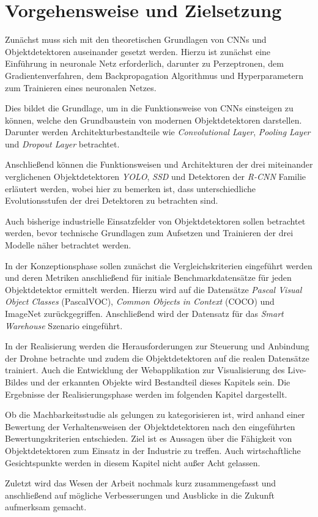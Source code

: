 \section{Vorgehensweise und Zielsetzung}

Zunächst muss sich mit den theoretischen Grundlagen von CNNs und Objektdetektoren auseinander gesetzt werden. Hierzu ist zunächst eine Einführung in neuronale Netz erforderlich, darunter zu Perzeptronen, dem Gradientenverfahren, dem Backpropagation Algorithmus und Hyperparametern zum Trainieren eines neuronalen Netzes. 

Dies bildet die Grundlage, um in die Funktionsweise von CNNs einsteigen zu können, welche den Grundbaustein von modernen Objektdetektoren darstellen. Darunter werden Architekturbestandteile wie \textit{Convolutional Layer}, \textit{Pooling Layer} und \textit{Dropout Layer} betrachtet. 

Anschließend können die Funktionsweisen und Architekturen der drei miteinander verglichenen Objektdetektoren \textit{YOLO}, \textit{SSD} und Detektoren der \textit{R-CNN} Familie erläutert werden, wobei hier zu bemerken ist, dass unterschiedliche Evolutionsstufen der drei Detektoren zu betrachten sind. 

Auch bisherige industrielle Einsatzfelder von Objektdetektoren sollen betrachtet werden, bevor technische Grundlagen zum Aufsetzen und Trainieren der drei Modelle näher betrachtet werden. 

In der Konzeptionsphase sollen zunächst die Vergleichskriterien eingeführt werden und deren Metriken anschließend für initiale Benchmarkdatensätze für jeden Objektdetektor ermittelt werden. Hierzu wird auf die Datensätze \textit{Pascal Visual Object Classes} (PascalVOC), \textit{Common Objects in Context} (COCO) und ImageNet zurückgegriffen. Anschließend wird der Datensatz für das \textit{Smart Warehouse} Szenario eingeführt. 

In der Realisierung werden die Herausforderungen zur Steuerung und Anbindung der Drohne betrachte und zudem die Objektdetektoren auf die realen Datensätze trainiert. Auch die Entwicklung der Webapplikation zur Visualisierung des Live-Bildes und der erkannten Objekte wird Bestandteil dieses Kapitels sein. Die Ergebnisse der Realisierungsphase werden im folgenden Kapitel dargestellt. 

Ob die Machbarkeitsstudie als gelungen zu kategorisieren ist, wird anhand einer Bewertung der Verhaltensweisen der Objektdetektoren nach den eingeführten Bewertungskriterien entschieden. Ziel ist es Aussagen über die Fähigkeit von Objektdetektoren zum Einsatz in der Industrie zu treffen. Auch wirtschaftliche Gesichtspunkte werden in diesem Kapitel nicht außer Acht gelassen. 

Zuletzt wird das Wesen der Arbeit nochmals kurz zusammengefasst und anschließend auf mögliche Verbesserungen und Ausblicke in die Zukunft aufmerksam gemacht. 
